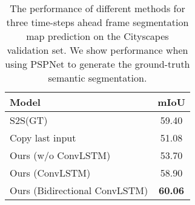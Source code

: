 \documentclass{bmvc2k}
\begin{document}
\begin{table}[!htb]
    \begin{center}
      \centering
        \begin{tabular}{|l|c|}
\hline
Model & mIoU\\
\hline\hline
S2S(GT) \cite{NextSegmPredICCV17}  & {59.40} \\ %
Copy last input  & {51.08}\\ 
\hline
Ours (w/o ConvLSTM) & {53.70}\\ 
Ours (ConvLSTM) & {58.90}\\ 
Ours (Bidirectional ConvLSTM) & {\bf 60.06 }\\
\hline
        \end{tabular}
    \end{center}
    \caption{The performance of different methods for three time-steps ahead frame segmentation map prediction on the Cityscapes validation set. We show performance when using PSPNet to generate the ground-truth semantic segmentation.}
    \label{table:three_time_ahead}
\end{table}
\end{document}
